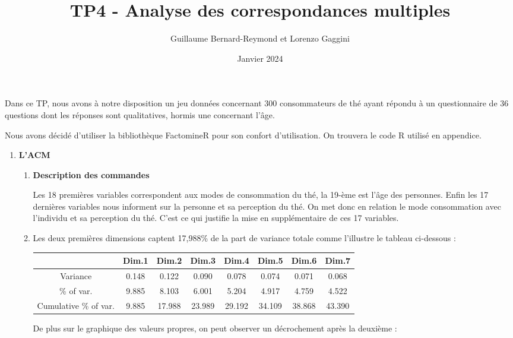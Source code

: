 \documentclass{article}
\title{TP4 - Analyse des correspondances multiples}
\author{Guillaume Bernard-Reymond et Lorenzo Gaggini}
\date{Janvier 2024}
\begin{document}
\newcommand{\norme}[1]{\left\| #1\right\|}
\newcommand{\tr}{\text{tr}}
\maketitle
\setlength{\parindent}{0pt}

Dans ce TP, nous avons à notre disposition un jeu données concernant 300 consommateurs de thé ayant répondu à un questionnaire de 36 questions dont les réponses sont qualitatives, hormis une concernant l'âge. 

Nous avons décidé d'utiliser la bibliothèque FactomineR pour son confort d'utilisation. On trouvera le code R utilisé en appendice.

\begin{enumerate}
\item \textbf{L'ACM}

	\begin{enumerate}
	\item \textbf{Description des commandes }
	
	Les 18 premières variables correspondent aux modes de consommation du thé, la 19-ème est l'âge des personnes. Enfin les 17 dernières variables nous informent sur la personne et sa perception du thé. On met donc en relation le mode consommation avec l'individu et sa perception du thé. C'est ce qui justifie la mise en supplémentaire de ces 17 variables.
	
	\item Les deux premières dimensions captent 17,988\% de la part de variance totale comme l'illustre le tableau ci-dessous : 
	
\begin{center}
\begin{tabular}{|c|c|c|c|c|c|c|c|}
\hline 
& Dim.1 &  Dim.2 &  Dim.3 &  Dim.4 &  Dim.5 &  Dim.6  & Dim.7 \\ 
\hline 
Variance & 0.148 &  0.122 &  0.090 &  0.078 &  0.074  & 0.071 &  0.068\\ 
\hline 
\% of var.   & 9.885 &  8.103 &  6.001 &  5.204 &  4.917 &  4.759 &  4.522\\ 
\hline 
Cumulative \% of var.  & 9.885 & 17.988 & 23.989 & 29.192  & 34.109 & 38.868 & 43.390 \\ 
\hline 
\end{tabular} 
\end{center}
	                      
De plus sur le graphique des valeurs propres, on peut observer un décrochement après la deuxième : 


\end{enumerate}
\end{enumerate}
\end{document}
